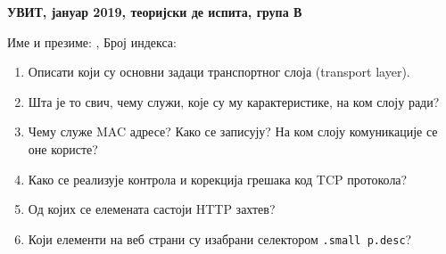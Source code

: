 \documentclass[a4paper]{article}
\begin{document}
\begin{center}
\textbf{УВИТ, јануар 2019, теоријски де испита, група В}  
\end{center}

Име и презиме: \hrulefill, Број индекса: \hrulefill

\begin{enumerate}

\item Описати који су основни задаци транспортног слоја (transport layer). \hrulefill

\hrulefill

\hrulefill

\hrulefill

\hrulefill


\item Шта је то свич, чему служи, које су му карактеристике, на ком слоју ради?\hrulefill

\hrulefill

\hrulefill

\hrulefill

\hrulefill



\item Чему служе MAC адресе? Како се записују? На ком слоју комуникације се оне користе?\hrulefill

\hrulefill

\hrulefill

\hrulefill

\hrulefill



\item Како се реализује контрола и корекција грешака код TCP протокола?\hrulefill


\hrulefill

\hrulefill

\hrulefill

\hrulefill

\hrulefill

\hrulefill


\item Од којих се елемената састоји HTTP захтев?\hrulefill

\hrulefill

\hrulefill

\hrulefill

\hrulefill

\hrulefill

\hrulefill


\item Који елементи на веб страни су изабрани селектором \verb|.small p.desc|? \hrulefill


\end{enumerate}
\end{document}
